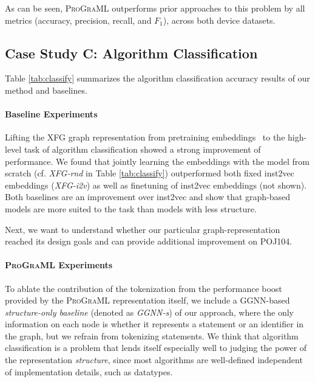 As can be seen, \textsc{ProGraML} outperforms prior approaches to this
problem by all metrics (accuracy, precision, recall, and $F_1$),
across both device datasets.


\begin{table}
  \centering%
  
  \caption{%
    Five approaches to predicting heterogeneous device mapping: (a)
    Static Mapping (b) DeepTune~\cite{Cummins2017b}, a sequential
    model using tokenized OpenCL, (c) DeepTune$_{\text{IR}}$, the same
    model adapted for tokenized LLVM-IR, (d) NCC, which uses
    pre-trained statement embeddings, and (e) \textsc{ProGraML}, our
    approach.%
  }%
  \label{figure:devmap_results} %
\end{table}


\subsection{Case Study C: Algorithm Classification}

Table \ref{tab:classify} summarizes the algorithm classification
accuracy results of our method and baselines.

\paragraph{Baseline Experiments} Lifting the XFG graph representation
from pretraining embeddings~\cite{Ben-nun2018} to the high-level task
of algorithm classification showed a strong improvement of
performance. We found that jointly learning the embeddings with the
model from scratch (cf. \emph{XFG-rnd} in Table \ref{tab:classify})
outperformed both fixed inst2vec embeddings (\emph{XFG-i2v}) as well
as finetuning of inst2vec embeddings (not shown). Both baselines are
an improvement over inst2vec and show that graph-based models are more
suited to the task than models with less structure.

Next, we want to understand whether our particular
graph-representation reached its design goals and can provide
additional improvement on POJ104.

\paragraph{\textsc{ProGraML} Experiments} To ablate the contribution
of the tokenization from the performance boost provided by the
\textsc{ProGraML} representation itself, we include a GGNN-based
\emph{structure-only baseline} (denoted as \emph{GGNN-s}) of our
approach, where the only information on each node is whether it
represents a statement or an identifier in the graph, but we refrain
from tokenizing statements.  We think that algorithm classification is
a problem that lends itself especially well to judging the power of
the representation \emph{structure}, since most algorithms are
well-defined independent of implementation details, such as datatypes.

